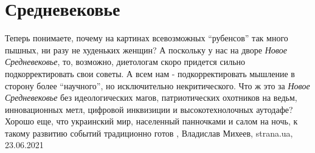  
 
 
 
 
\chapter{Средневековье}

Теперь понимаете, почему на картинах всевозможных \enquote{рубенсов} так много
пышных, ни разу не худеньких женщин?  А поскольку у нас на дворе \emph{Новое
Средневековье}, то, возможно, диетологам скоро придется сильно
подкорректировать свои советы. А всем нам - подкорректировать мышление в
сторону более \enquote{научного}, но исключительно некритического.  Что ж это
за \emph{Новое Средневековье} без идеологических магов, патриотических
охотников на ведьм, инновационных метл, цифровой инквизиции и высокотехнолочных
аутодафе?  Хорошо еще, что украинский мир, населенный панночками и салом на
ночь, к такому развитию событий традиционно готов
, 
Владислав Михеев, strana.ua, 23.06.2021

